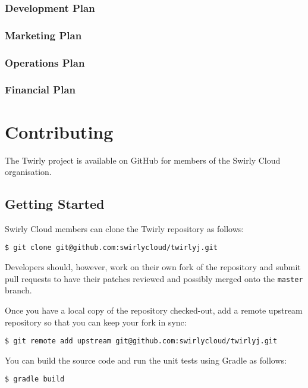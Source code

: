 \documentclass[11pt,a4paper]{article}
\newcommand{\scorg}{Swirly Cloud\cite{swirlycloud:github}}
\newcommand{\twirly}{Twirly\cite{twirly}}
\begin{document}
\begin{appendices}
\subsubsection{Development Plan}
\subsubsection{Marketing Plan}
\subsubsection{Operations Plan}
\subsubsection{Financial Plan}
  
\section{Contributing}

The \twirly{} project is available on GitHub\cite{github} for members of the \scorg{} organisation.

\subsection{Getting Started}

\scorg{} members can clone the \twirly{} repository as follows:

\lstset{language=sh}
\begin{lstlisting}
$ git clone git@github.com:swirlycloud/twirlyj.git 
\end{lstlisting}

Developers should, however, work on their own fork of the repository and submit pull requests to
have their patches reviewed and possibly merged onto the \texttt{master} branch.

Once you have a local copy of the repository checked-out, add a remote upstream repository so that
you can keep your fork in sync:

\lstset{language=sh}
\begin{lstlisting}
$ git remote add upstream git@github.com:swirlycloud/twirlyj.git
\end{lstlisting}

You can build the source code and run the unit tests using Gradle\cite{gradle} as follows:

\lstset{language=sh}
\begin{lstlisting}
$ gradle build
\end{lstlisting}


\end{appendices}
\end{document}
